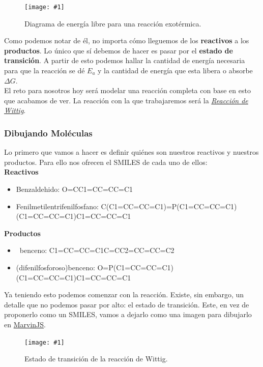 \documentclass[10pt,letterpaper]{article}
\newcommand{\Picture}[3]
{
	\begin{figure}[H]
	\begin{center}
	\caption{#3}
	\texttt{[image: \#1]}
	\end{center}
	\end{figure}
}
\begin{document}
\Picture{img/diagrama.png}{0.6}{Diagrama de energ\'ia libre para una reacci\'on exot\'ermica.}

Como podemos notar de \'el, no importa c\'omo lleguemos de los \textbf{reactivos} a los \textbf{productos}. Lo \'unico que s\'i debemos de hacer es pasar por el \textbf{estado de transici\'on}. A partir de esto podemos hallar la cantidad de energ\'ia necesaria para que la reacci\'on se d\'e $E_a$ y la cantidad de energ\'ia que esta libera o absorbe $\Delta G$.\\

El reto para nosotros hoy ser\'a modelar una reacci\'on completa con base en esto que acabamos de ver. La reacci\'on con la que trabajaremos ser\'a la \emph{\href{https://www.uam.es/departamentos/ciencias/qorg/docencia_red/qo/l9/prep3.html}{Reacci\'on de Wittig}}.

\subsubsection{Dibujando Mol\'eculas}
Lo primero que vamos a hacer es definir qui\'enes son nuestros reactivos y nuestros productos. Para ello nos ofrecen el SMILES de cada uno de ellos:\\

\textbf{Reactivos}
\begin{itemize}
\item Benzaldehido: O=CC1=CC=CC=C1
\item Fenilmetilentrifenilfosfano: C(C1=CC=CC=C1)=P(C1=CC=CC=C1)(C1=CC=CC=C1)C1=CC=CC=C1
\end{itemize}


\textbf{Productos}
\begin{itemize}
\item \ \hspace*{-1.5mm}benceno: C1=CC=CC=C1C=CC2=CC=CC=C2
\item (difenilfosforoso)benceno: O=P(C1=CC=CC=C1)(C1=CC=CC=C1)C1=CC=CC=C1
\end{itemize}

Ya teniendo esto podemos comenzar con la reacci\'on. Existe, sin embargo, un detalle que no podemos pasar por alto: el estado de transici\'on. Este, en vez de proponerlo como un SMILES, vamos a dejarlo como una imagen para dibujarlo en \href{https://marvinjs-demo.chemaxon.com/latest/demo.html}{MarvinJS}.

\Picture{img/molecula.png}{0.6}{Estado de transici\'on de la reacci\'on de Wittig.}
\end{document}
